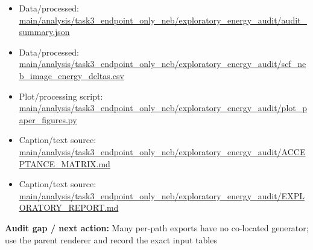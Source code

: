 \documentclass[10pt]{article}
\newcommand{\statusline}[1]{\colorbox{gray!12}{\parbox{0.96\linewidth}{#1}}}
\begin{document}
\begin{itemize}[leftmargin=1.4em,noitemsep]
\item Data/processed: \begingroup\scriptsize\url{main/analysis/task3_endpoint_only_neb/exploratory_energy_audit/audit_summary.json}\endgroup
\item Data/processed: \begingroup\scriptsize\url{main/analysis/task3_endpoint_only_neb/exploratory_energy_audit/scf_neb_image_energy_deltas.csv}\endgroup
\item Plot/processing script: \begingroup\scriptsize\url{main/analysis/task3_endpoint_only_neb/exploratory_energy_audit/plot_paper_figures.py}\endgroup
\item Caption/text source: \begingroup\scriptsize\url{main/analysis/task3_endpoint_only_neb/exploratory_energy_audit/ACCEPTANCE_MATRIX.md}\endgroup
\item Caption/text source: \begingroup\scriptsize\url{main/analysis/task3_endpoint_only_neb/exploratory_energy_audit/EXPLORATORY_REPORT.md}\endgroup
\end{itemize}
\statusline{\textbf{Audit gap / next action:} Many per-path exports have no co-located generator; use the parent renderer and record the exact input tables}
\vfill
\clearpage
\end{document}
